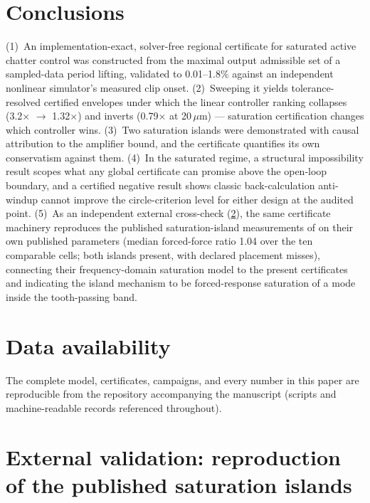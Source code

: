 \documentclass[preprint,12pt]{elsarticle}
\newcommand{\um}{\,\ensuremath{\mu\mathrm{m}}}
\begin{document}
\section{Conclusions}
\label{sec:conclusions}

(1)~An implementation-exact, solver-free regional certificate for
saturated active chatter control was constructed from the maximal
output admissible set of a sampled-data period lifting, validated to
0.01--1.8\% against an independent nonlinear simulator's measured
clip onset. (2)~Sweeping it yields tolerance-resolved certified
envelopes under which the linear controller ranking collapses
(3.2$\times$ $\to$ 1.32$\times$) and inverts (0.79$\times$ at
20\um) --- saturation certification changes which controller wins.
(3)~Two saturation islands were demonstrated with causal attribution
to the amplifier bound, and the certificate quantifies its own
conservatism against them. (4)~In the saturated regime, a structural
impossibility result scopes what any global certificate can promise
above the open-loop boundary, and a certified negative result shows
classic back-calculation anti-windup cannot improve the
circle-criterion level for either design at the audited point.
(5)~As an independent external cross-check (\ref{sec:ozsoy}),
the same certificate machinery reproduces the published
saturation-island measurements of \cite{ozsoy2025mssp} on their own
published parameters (median forced-force ratio 1.04 over the ten
comparable cells; both islands present, with declared placement
misses), connecting their frequency-domain saturation model to the
present certificates and indicating the island mechanism to be
forced-response saturation of a mode inside the tooth-passing band.

\section*{Data availability}
The complete model, certificates, campaigns, and every number in this
paper are reproducible from the repository accompanying the
manuscript (scripts and machine-readable records referenced
throughout).

\appendix
\setcounter{figure}{0}
\section{External validation: reproduction of the published
saturation islands}
\label{sec:ozsoy}
\end{document}
